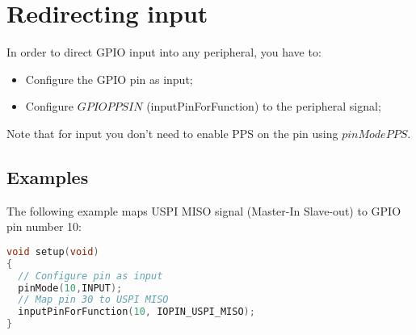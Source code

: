 \section{Redirecting input}
In order to direct GPIO input into any peripheral, you have to:
\begin{itemize}
\item Configure the GPIO pin as input;
\item Configure $GPIOPPSIN$ (inputPinForFunction) to the peripheral signal;
\end{itemize}

Note that for input you don't need to enable PPS on the pin using $pinModePPS$.\\

\subsection{Examples}
The following example maps USPI MISO signal (Master-In Slave-out) to GPIO pin number 10:
\begin{lstlisting}[language=C++]
void setup(void)
{
  // Configure pin as input
  pinMode(10,INPUT); 
  // Map pin 30 to USPI MISO
  inputPinForFunction(10, IOPIN_USPI_MISO); 
}
\end{lstlisting}
